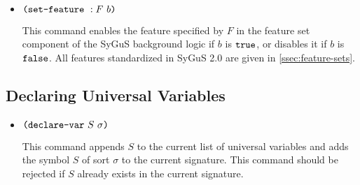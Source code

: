 \documentclass[english,a4paper,10pt]{article}
\begin{document}
\begin{itemize}
\begin{comment}
\item $\paren{\setlogicoutputkwd\mbox{ }S}$

This sets the output logic component of the SyGuS background logic
to the one $S$ refers to.
This command imposes the same restrictions on logics
as the previous command, and adds the set of sort and function symbols
from the logic to the current signature.

\item $\paren{\setfeaturesetkwd\mbox{ }S}$

This sets the feature set component of the SyGuS background logic
to the one specified by symbol $S$.
We do not standardize any examples of feature sets
in this document.
We remark that a feature set may correspond to a class of synthesis problems,
for example, synthesis conjectures having
a single non-recursive function-to-synthesize.
\end{comment}

\item $\texttt{(}\texttt{set-feature}\mbox{ }:F\mbox{ }b\texttt{)}$

This command enables the feature specified by $F$
in the feature set component of the SyGuS background logic
if $b$ is $\texttt{true}$, or disables it if $b$ is $\texttt{false}$.
All features standardized in SyGuS 2.0
are given in \cref{ssec:feature-sets}.

\end{itemize}

\subsection{Declaring Universal Variables}

\begin{itemize}
\item $\texttt{(}\texttt{declare-var}\mbox{ }S\mbox{ }\sigma\texttt{)}$

This command appends $S$ to the current list of universal variables
and adds the symbol $S$ of sort $\sigma$ to the current signature.
This command should be rejected if $S$ already
exists in the current signature.





\end{itemize}
\end{document}
